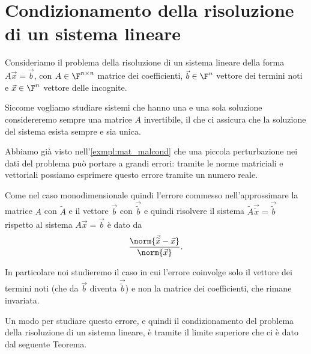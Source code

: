 \section{Condizionamento della risoluzione di un sistema lineare}

Consideriamo il problema della risoluzione di un sistema lineare della forma $A\vec x = \vec b$, con $A \in \Mat{\F, n, n}$ matrice dei coefficienti, $\vec b \in \F^n$ vettore dei termini noti e $\vec x \in \F^n$ vettore delle incognite.

Siccome vogliamo studiare sistemi che hanno una e una sola soluzione considereremo sempre una matrice $A$ invertibile, il che ci assicura che la soluzione del sistema esista sempre e sia unica.

Abbiamo già visto nell'\autoref{exmpl:mat_malcond} che una piccola perturbazione nei dati del problema può portare a grandi errori: tramite le norme matriciali e vettoriali possiamo esprimere questo errore tramite un numero reale.

Come nel caso monodimensionale quindi l'errore commesso nell'approssimare la matrice $A$ con $\tilde A$ e il vettore $\vec b$ con $\vec{\tilde b}$ e quindi risolvere il sistema $\tilde{A}\vec{\tilde x} = \vec{\tilde b}$ rispetto al sistema $A\vec x = \vec b$ è dato da \[
    \frac{\norm{\vec{\tilde x} - \vec x}}{\norm{\vec x}}.
\]

In particolare noi studieremo il caso in cui l'errore coinvolge solo il vettore dei termini noti (che da $\vec b$ diventa $\vec{\tilde b}$) e non la matrice dei coefficienti, che rimane invariata.

Un modo per studiare questo errore, e quindi il condizionamento del problema della risoluzione di un sistema lineare, è tramite il limite superiore che ci è dato dal seguente Teorema.

